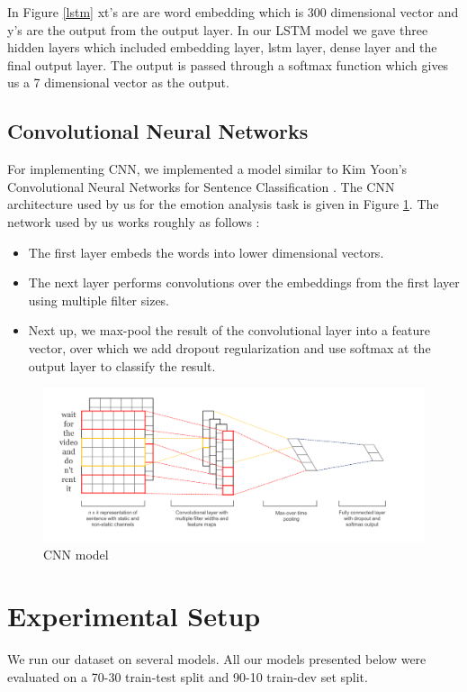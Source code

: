 \documentclass[conference]{IEEEtran}
\numberwithin{equation}{section}
\numberwithin{figure}{section}
\numberwithin{table}{section}
\begin{document}
In Figure \ref{lstm} xt's are are word embedding which is 300 dimensional vector and y's are the output from the output layer. In our LSTM model we gave three hidden layers which included embedding layer, lstm layer, dense layer and the final output layer. The output is passed through a softmax function which gives us a 7 dimensional vector as the output. 


\subsection{Convolutional Neural Networks}
For implementing CNN, we implemented a model similar to Kim Yoon's Convolutional Neural Networks for Sentence Classification \cite{kimyoon} \cite{wildmlcnn}.
The CNN architecture used by us for the emotion analysis task is given in Figure \ref{fig_cnn}. The network used by us works roughly as follows : 
\begin{itemize}
\item The first layer embeds the words into lower dimensional vectors.
\item The next layer performs convolutions over the embeddings from the first layer using multiple filter sizes.
\item Next up, we max-pool the result of the convolutional layer into a feature vector, over which we add dropout regularization and use softmax at the output layer to classify the result.
\end{itemize}


\begin{figure}
  \centering
  \includegraphics[width=\columnwidth]{cnn_arch}
  \caption{CNN model}
    \label{fig_cnn}
\end{figure}

\section{Experimental Setup}
We run our dataset on several models. 
All our models presented below were evaluated on a 70-30 train-test split and 90-10 train-dev set split.
\end{document}
